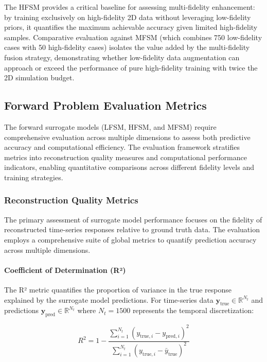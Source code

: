 \documentclass[12pt,a4paper]{report}
\begin{document}
The HFSM provides a critical baseline for assessing multi-fidelity enhancement: by training exclusively on high-fidelity 2D data without leveraging low-fidelity priors, it quantifies the maximum achievable accuracy given limited high-fidelity samples. Comparative evaluation against MFSM (which combines 750 low-fidelity cases with 50 high-fidelity cases) isolates the value added by the multi-fidelity fusion strategy, demonstrating whether low-fidelity data augmentation can approach or exceed the performance of pure high-fidelity training with twice the 2D simulation budget.


\subsection{Forward Problem Evaluation Metrics}

The forward surrogate models (LFSM, HFSM, and MFSM) require comprehensive evaluation across multiple dimensions to assess both predictive accuracy and computational efficiency. The evaluation framework stratifies metrics into reconstruction quality measures and computational performance indicators, enabling quantitative comparisons across different fidelity levels and training strategies.

\subsubsection{Reconstruction Quality Metrics}

The primary assessment of surrogate model performance focuses on the fidelity of reconstructed time-series responses relative to ground truth data. The evaluation employs a comprehensive suite of global metrics to quantify prediction accuracy across multiple dimensions.

\paragraph{Coefficient of Determination (R²)} The R² metric quantifies the proportion of variance in the true response explained by the surrogate model predictions. For time-series data $\mathbf{y}_{\text{true}} \in \mathbb{R}^{N_t}$ and predictions $\mathbf{y}_{\text{pred}} \in \mathbb{R}^{N_t}$ where $N_t = 1500$ represents the temporal discretization:

\begin{equation}
R^2 = 1 - \frac{\sum_{i=1}^{N_t} (y_{\text{true},i} - y_{\text{pred},i})^2}{\sum_{i=1}^{N_t} (y_{\text{true},i} - \bar{y}_{\text{true}})^2}
\end{equation}
\end{document}
